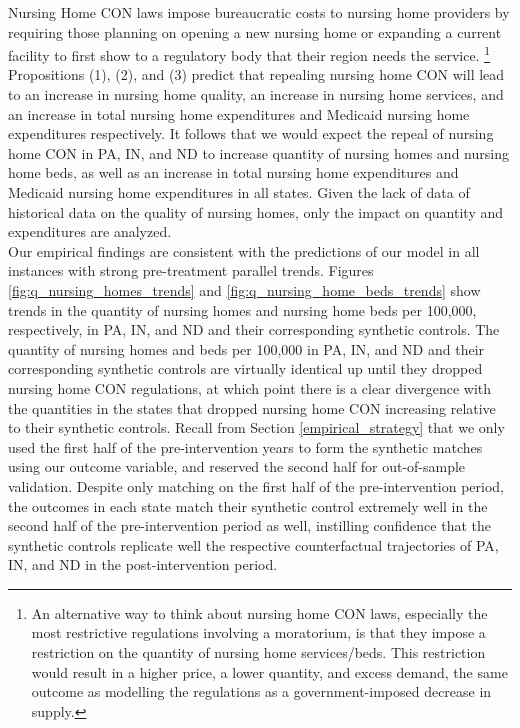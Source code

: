 \documentclass[../Main.tex]{subfiles}
\begin{document}
Nursing Home CON laws impose bureaucratic costs to nursing home providers by requiring those planning on opening a new nursing home or expanding a current facility to first show to a regulatory body that their region needs the service. \footnote{An alternative way to think about nursing home CON laws, especially the most restrictive regulations involving a moratorium, is that they impose a restriction on the quantity of nursing home services/beds. This restriction would result in a higher price, a lower quantity, and excess demand, the same outcome as modelling the regulations as a government-imposed decrease in supply.} Propositions (1), (2), and (3) predict that repealing nursing home CON will lead to an increase in nursing home quality, an increase in nursing home services, and an increase in total nursing home expenditures and Medicaid nursing home expenditures respectively. It follows that we would expect the repeal of nursing home CON in PA, IN, and ND to increase quantity of nursing homes and nursing home beds, as well as an increase in total nursing home expenditures and Medicaid nursing home expenditures in all states. Given the lack of data of historical data on the quality of nursing homes, only the impact on quantity and expenditures are analyzed.  \\ 
\indent Our empirical findings are consistent with the predictions of our model in all instances with strong pre-treatment parallel trends. Figures \ref{fig:q_nursing_homes_trends} and \ref{fig:q_nursing_home_beds_trends} show trends in the quantity of nursing homes and nursing home beds per 100,000, respectively, in PA, IN, and ND and their corresponding synthetic controls. The quantity of nursing homes and beds per 100,000 in PA, IN, and ND and their corresponding synthetic controls are virtually identical up until they dropped nursing home CON regulations, at which point there is a clear divergence with the quantities in the states that dropped nursing home CON increasing relative to their synthetic controls. Recall from Section \ref{empirical_strategy} that we only used the first half of the pre-intervention years to form the synthetic matches using our outcome variable, and reserved the second half for out-of-sample validation. Despite only matching on the first half of the pre-intervention period, the outcomes in each state match their synthetic control extremely well in the second half of the pre-intervention period as well, instilling confidence that the synthetic controls replicate well the respective counterfactual trajectories of PA, IN, and ND in the post-intervention period.\\
\end{document}
